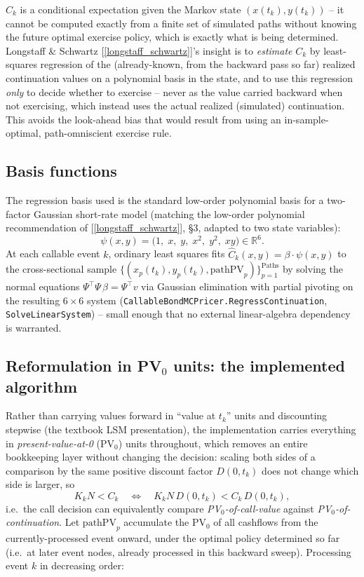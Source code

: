 \documentclass[11pt,a4paper]{article}
\newcommand{\R}{\mathbb{R}}
\newcommand{\coderef}[1]{\texttt{\color{blue!60!black}#1}}
\theoremstyle{definition}
\begin{document}
$C_k$ is a conditional expectation given the Markov state $(x(t_k),y(t_k))$
-- it cannot be computed exactly from a finite set of simulated paths
without knowing the future optimal exercise policy, which is exactly what
is being determined. Longstaff \& Schwartz [\ref{longstaff_schwartz}]'s
insight is to \emph{estimate} $C_k$ by least-squares regression of the
(already-known, from the backward pass so far) realized continuation values
on a polynomial basis in the state, and to use this regression \emph{only}
to decide whether to exercise -- never as the value carried backward when
not exercising, which instead uses the actual realized (simulated)
continuation. This avoids the look-ahead bias that would result from
using an in-sample-optimal, path-omniscient exercise rule.

\subsection{Basis functions}

The regression basis used is the standard low-order polynomial basis for a
two-factor Gaussian short-rate model (matching the low-order polynomial
recommendation of [\ref{longstaff_schwartz}], \S3, adapted to two state
variables):
\begin{equation}
  \psi(x,y) = \bigl(1,\; x,\; y,\; x^2,\; y^2,\; xy\bigr) \in \R^6.
  \label{eq:basis}
\end{equation}
At each callable event $k$, ordinary least squares fits
$\hat{C}_k(x,y)=\beta\cdot\psi(x,y)$ to the cross-sectional sample
$\{(x_p(t_k), y_p(t_k), \text{pathPV}_p)\}_{p=1}^{\text{Paths}}$ by solving
the normal equations $\Psi^\top\Psi\,\beta = \Psi^\top v$ via Gaussian
elimination with partial pivoting on the resulting $6\times6$ system
(\coderef{CallableBondMCPricer.RegressContinuation},
\coderef{SolveLinearSystem}) -- small enough that no external linear-algebra
dependency is warranted.

\subsection{Reformulation in PV$_0$ units: the implemented algorithm}
\label{sec:pv0-reformulation}

Rather than carrying values forward in ``value at $t_k$'' units and
discounting stepwise (the textbook LSM presentation), the implementation
carries everything in \emph{present-value-at-0} (PV$_0$) units throughout,
which removes an entire bookkeeping layer without changing the decision:
scaling both sides of a comparison by the same positive discount factor
$D(0,t_k)$ does not change which side is larger, so
\[
  K_kN < C_k \quad\Longleftrightarrow\quad K_kN\,D(0,t_k) < C_k\,D(0,t_k),
\]
i.e.\ the call decision can equivalently compare \emph{PV$_0$-of-call-value}
against \emph{PV$_0$-of-continuation}. Let $\text{pathPV}_p$ accumulate the
PV$_0$ of all cashflows from the currently-processed event onward, under the
optimal policy determined so far (i.e.\ at later event nodes, already
processed in this backward sweep). Processing event $k$ in decreasing order:
\end{document}
